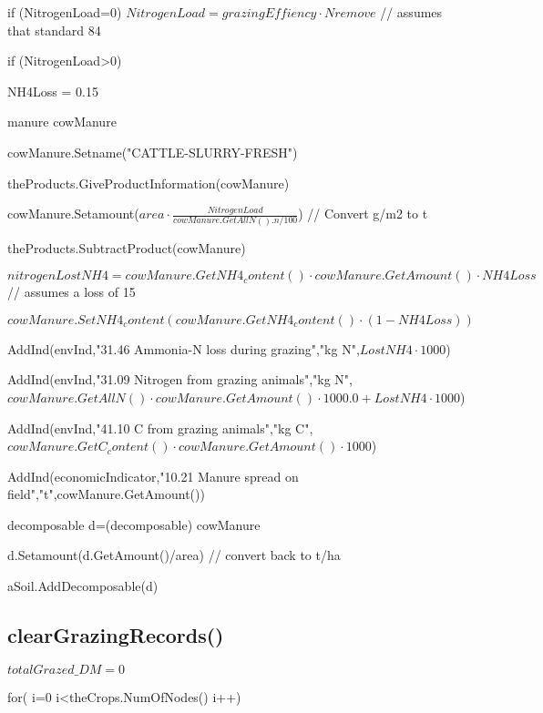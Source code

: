 \documentclass[%
]{scrartcl}
\begin{document}
   if (NitrogenLoad=0)
   	$NitrogenLoad = grazingEffiency \cdot Nremove $             // assumes that standard 84%

   if (NitrogenLoad>0)
   
  \quad	  NH4Loss = 0.15
  
\quad			manure cowManure

	  \quad		cowManure.Setname("CATTLE-SLURRY-FRESH")
     
   \quad	theProducts.GiveProductInformation(cowManure)
   
 \quad	    cowManure.Setamount($area \cdot \tfrac{NitrogenLoad}{cowManure.GetAllN().n/100}$)                          // Convert g/m2 to t
 
   \quad	    theProducts.SubtractProduct(cowManure)

     \quad	   $nitrogen LostNH4 = cowManure.GetNH4_content() \cdot cowManure.GetAmount() \cdot NH4Loss  $                                      // assumes a loss of 15%
     
 \quad	 $ cowManure.SetNH4_content(cowManure.GetNH4_content() \cdot (1-NH4Loss))$

      \quad	  AddInd(envInd,"31.46 Ammonia-N loss during grazing","kg N",$LostNH4 \cdot 1000$)
      
\quad	  AddInd(envInd,"31.09 Nitrogen from grazing animals","kg N",
                             $ cowManure.GetAllN() \cdot cowManure.GetAmount() \cdot 1000.0+LostNH4 \cdot 1000$)
    
  \quad	 AddInd(envInd,"41.10 C from grazing animals","kg C",
                              $cowManure.GetC_content() \cdot cowManure.GetAmount() \cdot 1000$)
   
  \quad	   AddInd(economicIndicator,"10.21 Manure spread on field","t",cowManure.GetAmount())

      \quad	  decomposable d=(decomposable) cowManure
   
   \quad	  d.Setamount(d.GetAmount()/area)                                                               // convert back to t/ha
	 
 \quad		aSoil.AddDecomposable(d)
 



\subsection{clearGrazingRecords()}	

 $totalGrazed\_DM=0$

   for( i=0 i<theCrops.NumOfNodes() i++)
	
\end{document}

